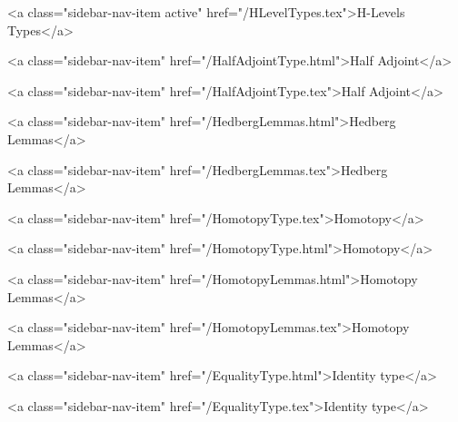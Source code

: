       
        
          <a class="sidebar-nav-item active" href="/HLevelTypes.tex">H-Levels Types</a>
        
      
    
      
        
          <a class="sidebar-nav-item" href="/HalfAdjointType.html">Half Adjoint</a>
        
      
    
      
        
          <a class="sidebar-nav-item" href="/HalfAdjointType.tex">Half Adjoint</a>
        
      
    
      
        
          <a class="sidebar-nav-item" href="/HedbergLemmas.html">Hedberg Lemmas</a>
        
      
    
      
        
          <a class="sidebar-nav-item" href="/HedbergLemmas.tex">Hedberg Lemmas</a>
        
      
    
      
        
          <a class="sidebar-nav-item" href="/HomotopyType.tex">Homotopy</a>
        
      
    
      
        
          <a class="sidebar-nav-item" href="/HomotopyType.html">Homotopy</a>
        
      
    
      
        
          <a class="sidebar-nav-item" href="/HomotopyLemmas.html">Homotopy Lemmas</a>
        
      
    
      
        
          <a class="sidebar-nav-item" href="/HomotopyLemmas.tex">Homotopy Lemmas</a>
        
      
    
      
        
          <a class="sidebar-nav-item" href="/EqualityType.html">Identity type</a>
        
      
    
      
        
          <a class="sidebar-nav-item" href="/EqualityType.tex">Identity type</a>
        
      
    

